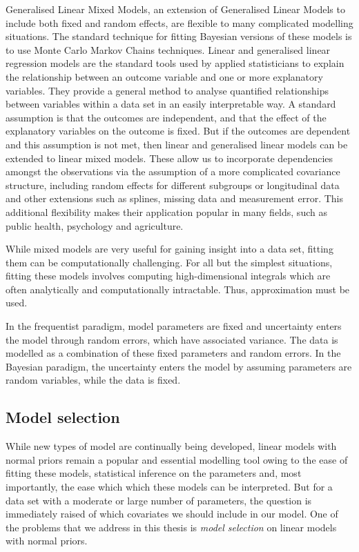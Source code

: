 Generalised Linear Mixed Models, an extension of Generalised Linear Models to include both fixed and random
effects, are flexible to many complicated modelling situations. The standard technique for fitting Bayesian
versions of these models is to use Monte Carlo Markov Chains techniques. Linear and generalised linear
regression models are the standard tools used by applied statisticians to explain the relationship between an
outcome variable and one or more explanatory variables. They provide a general method  to analyse quantified
relationships between variables within a data set in an easily interpretable way. A standard assumption is
that the outcomes are independent, and that the effect of the explanatory variables on the outcome is fixed.
But if the outcomes are dependent and this assumption is not met, then linear and generalised linear models
can be extended to linear mixed models. These allow us to incorporate dependencies amongst the  observations
via the assumption of a more complicated covariance structure, including random effects for  different
subgroups or longitudinal data and other extensions such as splines, missing data and measurement error. This
additional flexibility makes their application popular in many fields, such as public health, psychology and
agriculture.

While mixed models are very useful for gaining insight into a data set, fitting them can be computationally
challenging. For all but the simplest situations, fitting these models involves computing high-dimensional
integrals which are often analytically and computationally intractable. Thus, approximation must be used.

In the frequentist paradigm, model parameters are fixed and uncertainty enters the model through random
errors, which have associated variance. The data is modelled as a combination of these fixed parameters and
random errors. In the Bayesian paradigm, the uncertainty enters the model by assuming parameters are random
variables, while the data is fixed.

\subsection{Model selection}

While new types of model are continually being developed, linear models with normal priors remain a popular
and essential modelling tool owing to the ease of fitting these models, statistical inference on the
parameters and, most importantly, the ease which which these models can be interpreted. But for a data set
with a moderate or large number of parameters, the question is immediately raised of which covariates we should
include in our model. One of the problems that we address in this thesis is \emph{model selection} on linear
models with normal priors.

